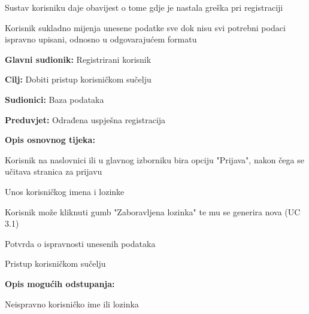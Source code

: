 \begin{packed_item}
\begin{packed_item}
\begin{packed_enum}
								\item Sustav korisniku daje obavijest o tome gdje je nastala greška pri registraciji
								\item Korisnik sukladno mijenja unesene podatke sve dok nisu svi potrebni podaci ispravno upisani, odnosno u odgovarajućem formatu
								
							\end{packed_enum}
							
						\end{packed_item}
			
					\end{packed_item}

					\noindent {}
					\begin{packed_item}
	
						\item \textbf{Glavni sudionik: } Registrirani korisnik
						\item  \textbf{Cilj:} Dobiti pristup korisničkom sučelju
						\item  \textbf{Sudionici:} Baza podataka
						\item  \textbf{Preduvjet:} Odrađena uspješna registracija
						\item  \textbf{Opis osnovnog tijeka:}
						
						\item[] \begin{packed_enum}

							\item Korisnik na naslovnici ili u glavnog izborniku bira opciju "Prijava", nakon čega se učitava stranica za prijavu
							\item Unos korisničkog imena i lozinke
							\item Korisnik može kliknuti gumb "Zaboravljena lozinka" te mu se generira nova (UC 3.1)
							\item Potvrda o ispravnosti unesenih podataka
							\item Pristup korisničkom sučelju
					
						\end{packed_enum}

						\item  \textbf{Opis mogućih odstupanja:}
						
						\item[] \begin{packed_item}
	
							\item[2.a]  Neispravno korisničko ime ili lozinka
							\item[] \begin{packed_enum}
								

\end{packed_enum}
\end{packed_item}
\end{packed_item}
